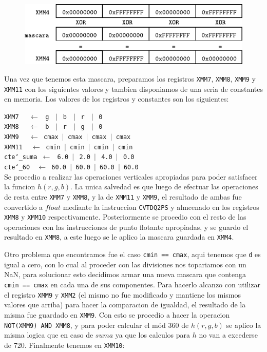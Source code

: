 \begin{figure}[!h]
	\centering
	\includegraphics[scale=1.25]{images/HSLASM1_1}
\end{figure}

Una vez que tenemos esta mascara, preparamos los registros \texttt{XMM7}, \texttt{XMM8}, \texttt{XMM9} y \texttt{XMM11} con los siguientes valores y tambien disponiamos de una seria de constantes en memoria. Los valores de los registros y constantes son los siguientes:

\noindent
\texttt{XMM7  $\ \ \ \ \gets\ $ g $\ \ \vert\ $ b $\ \ \vert\ $ r  $\ \ \vert\ $ 0}\\
\texttt{XMM8  $\ \ \ \ \gets\ $ b $\ \ \vert\ $ r $\ \ \vert\ $ g  $\ \ \vert\ $ 0}\\
\texttt{XMM9  $\ \ \ \ \gets$ cmax $\vert$ cmax    $\vert$ cmax $\vert$ cmax}\\
\texttt{XMM11 $\ \ \ \gets$ cmin $\vert$ cmin    $\vert$ cmin $\vert$ cmin}\\
\texttt{cte\char`_suma $\gets\ $ 6.0 $\vert\ $ 2.0 $\vert\ $ 4.0 $\vert\ $ 0.0}\\
\texttt{cte\char`_60 $\ \ \gets$ 60.0 $\vert$ 60.0 $\vert$ 60.0 $\vert$ 60.0}\\

Se procedio a realizar las operaciones verticales apropiadas para poder satisfacer la funcion $h(r,g,b)$. La unica salvedad es que luego de efectuar las operaciones de resta entre \texttt{XMM7} y \texttt{XMM8}, y la de \texttt{XMM11} y \texttt{XMM9}, el resultado de ambas fue convertido a $float$ mediante la instruccion \texttt{CVTDQ2PS} y almcenado en los registros \texttt{XMM8} y \texttt{XMM10} respectivamente. Posteriormente se procedio con el resto de las operaciones con las instrucciones de punto flotante apropiadas, y se guardo el resultado en \texttt{XMM8}, a este luego se le aplico la mascara guardada en \texttt{XMM4}.

Otro problema que encontramos fue el caso \texttt{cmin == cmax}, aqui tenemos que \texttt{d} es igual a cero, con lo cual al proceder con las divisiones nos topariamos con un NaN, para solucionar esto decidimos armar una nueva mascara que contenga \texttt{cmin == cmax} en cada una de sus componentes. Para hacerlo alcanzo con utilizar el registro \texttt{XMM9} y \texttt{XMM2} (el mismo no fue modificado y mantiene los mismos valores que arriba) para hacer la comparacion de igualdad, el resultado de la misma fue guardado en \texttt{XMM9}. Con esto se procedio a hacer la operacion \texttt{NOT(XMM9) AND XMM8}, y para poder calcular el mód 360 de $h(r,g,b)$ se aplico la misma logica que en caso de $suma$ ya que los calculos para $h$ no van a excederse de 720. Finalmente tenemos en \texttt{XMM10}:\\

